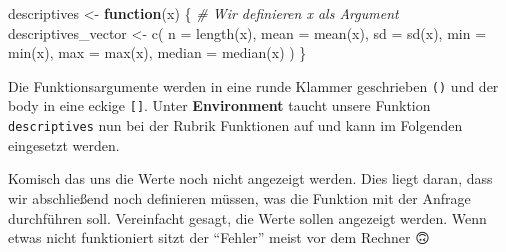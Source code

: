 \documentclass[
]{article}
\newenvironment{Shaded}{\begin{snugshade}}{\end{snugshade}}
\newcommand{\AttributeTok}[1]{\textcolor[rgb]{0.77,0.63,0.00}{#1}}
\newcommand{\CommentTok}[1]{\textcolor[rgb]{0.56,0.35,0.01}{\textit{#1}}}
\newcommand{\ControlFlowTok}[1]{\textcolor[rgb]{0.13,0.29,0.53}{\textbf{#1}}}
\newcommand{\FunctionTok}[1]{\textcolor[rgb]{0.00,0.00,0.00}{#1}}
\newcommand{\NormalTok}[1]{#1}
\newcommand{\OtherTok}[1]{\textcolor[rgb]{0.56,0.35,0.01}{#1}}
\newcommand{\SpecialCharTok}[1]{\textcolor[rgb]{0.00,0.00,0.00}{#1}}
\begin{document}
\begin{Shaded}
\begin{Highlighting}[]
\NormalTok{descriptives }\OtherTok{\textless{}{-}} \ControlFlowTok{function}\NormalTok{(x) \{ }\CommentTok{\# Wir definieren \textquotesingle{}x\textquotesingle{} als Argument}
\NormalTok{  descriptives\_vector }\OtherTok{\textless{}{-}} \FunctionTok{c}\NormalTok{(}
    \AttributeTok{n =} \FunctionTok{length}\NormalTok{(x),}
    \AttributeTok{mean =} \FunctionTok{mean}\NormalTok{(x),}
    \AttributeTok{sd =} \FunctionTok{sd}\NormalTok{(x),}
    \AttributeTok{min =} \FunctionTok{min}\NormalTok{(x),}
    \AttributeTok{max =} \FunctionTok{max}\NormalTok{(x),}
    \AttributeTok{median =} \FunctionTok{median}\NormalTok{(x)}
\NormalTok{  )}
\NormalTok{\}}
\end{Highlighting}
\end{Shaded}

Die Funktionsargumente werden in eine runde Klammer geschrieben \texttt{()} und der body in eine eckige \texttt{{[}{]}}. Unter \textbf{Environment} taucht unsere Funktion \texttt{descriptives} nun bei der Rubrik Funktionen auf und kann im Folgenden eingesetzt werden.

\begin{Shaded}
\end{Shaded}

Komisch das uns die Werte noch nicht angezeigt werden. Dies liegt daran, dass wir abschließend noch definieren müssen, was die Funktion mit der Anfrage durchführen soll. Vereinfacht gesagt, die Werte sollen angezeigt werden. Wenn etwas nicht funktioniert sitzt der ``Fehler'' meist vor dem Rechner 🙃
\end{document}
